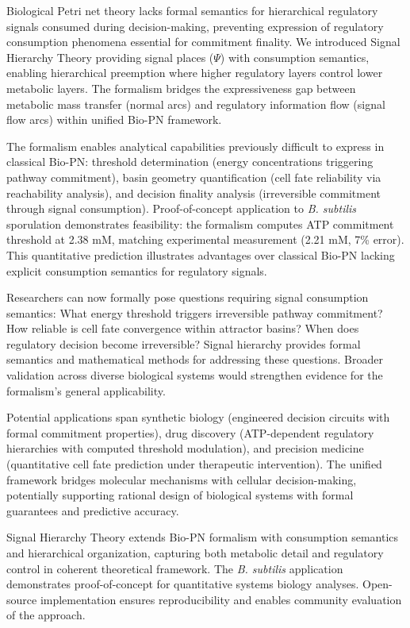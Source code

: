 
Biological Petri net theory lacks formal semantics for hierarchical regulatory signals consumed during decision-making, preventing expression of regulatory consumption phenomena essential for commitment finality. We introduced Signal Hierarchy Theory providing signal places ($\Psi$) with consumption semantics, enabling hierarchical preemption where higher regulatory layers control lower metabolic layers. The formalism bridges the expressiveness gap between metabolic mass transfer (normal arcs) and regulatory information flow (signal flow arcs) within unified Bio-PN framework.

\vspace{3pt}
\noindent The formalism enables analytical capabilities previously difficult to express in classical Bio-PN: threshold determination (energy concentrations triggering pathway commitment), basin geometry quantification (cell fate reliability via reachability analysis), and decision finality analysis (irreversible commitment through signal consumption). Proof-of-concept application to \textit{B. subtilis} sporulation demonstrates feasibility: the formalism computes ATP commitment threshold at 2.38 mM, matching experimental measurement (2.21 mM, 7\% error). This quantitative prediction illustrates advantages over classical Bio-PN lacking explicit consumption semantics for regulatory signals.

\vspace{3pt}
\noindent Researchers can now formally pose questions requiring signal consumption semantics: What energy threshold triggers irreversible pathway commitment? How reliable is cell fate convergence within attractor basins? When does regulatory decision become irreversible? Signal hierarchy provides formal semantics and mathematical methods for addressing these questions. Broader validation across diverse biological systems would strengthen evidence for the formalism's general applicability.

\vspace{3pt}
\noindent Potential applications span synthetic biology (engineered decision circuits with formal commitment properties), drug discovery (ATP-dependent regulatory hierarchies with computed threshold modulation), and precision medicine (quantitative cell fate prediction under therapeutic intervention). The unified framework bridges molecular mechanisms with cellular decision-making, potentially supporting rational design of biological systems with formal guarantees and predictive accuracy.

\vspace{3pt}
\noindent Signal Hierarchy Theory extends Bio-PN formalism with consumption semantics and hierarchical organization, capturing both metabolic detail and regulatory control in coherent theoretical framework. The \textit{B. subtilis} application demonstrates proof-of-concept for quantitative systems biology analyses. Open-source implementation ensures reproducibility and enables community evaluation of the approach.
